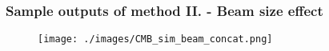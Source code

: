 \begin{frame}
\frametitle{Sample outputs of method II. - Beam size effect}

\begin{figure}
	\texttt{[image: ./images/CMB\_sim\_beam\_concat.png]}
\end{figure}

\end{frame}
